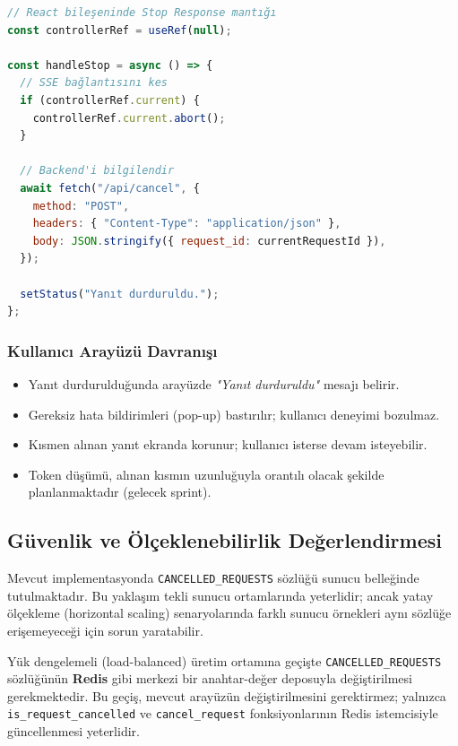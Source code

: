 \documentclass[12pt,a4paper]{article}
\begin{document}
\begin{lstlisting}[language=JavaScript, caption={Frontend AbortController Entegrasyonu}]
// React bileşeninde Stop Response mantığı
const controllerRef = useRef(null);

const handleStop = async () => {
  // SSE bağlantısını kes
  if (controllerRef.current) {
    controllerRef.current.abort();
  }

  // Backend'i bilgilendir
  await fetch("/api/cancel", {
    method: "POST",
    headers: { "Content-Type": "application/json" },
    body: JSON.stringify({ request_id: currentRequestId }),
  });

  setStatus("Yanıt durduruldu.");
};
\end{lstlisting}

\subsubsection{Kullanıcı Arayüzü Davranışı}

\begin{notebox}
\begin{itemize}[leftmargin=1.5em, itemsep=2pt]
    \item Yanıt durdurulduğunda arayüzde \emph{"Yanıt durduruldu"} mesajı belirir.
    \item Gereksiz hata bildirimleri (pop-up) bastırılır; kullanıcı deneyimi bozulmaz.
    \item Kısmen alınan yanıt ekranda korunur; kullanıcı isterse devam isteyebilir.
    \item Token düşümü, alınan kısmın uzunluğuyla orantılı olacak şekilde planlanmaktadır (gelecek sprint).
\end{itemize}
\end{notebox}

\subsection{Güvenlik ve Ölçeklenebilirlik Değerlendirmesi}

Mevcut implementasyonda \texttt{CANCELLED\_REQUESTS} sözlüğü sunucu belleğinde tutulmaktadır. Bu yaklaşım tekli sunucu ortamlarında yeterlidir; ancak yatay ölçekleme (horizontal scaling) senaryolarında farklı sunucu örnekleri aynı sözlüğe erişemeyeceği için sorun yaratabilir.

\begin{warnbox}
Yük dengelemeli (load-balanced) üretim ortamına geçişte \texttt{CANCELLED\_REQUESTS} sözlüğünün \textbf{Redis} gibi merkezi bir anahtar-değer deposuyla değiştirilmesi gerekmektedir. Bu geçiş, mevcut arayüzün değiştirilmesini gerektirmez; yalnızca \texttt{is\_request\_cancelled} ve \texttt{cancel\_request} fonksiyonlarının Redis istemcisiyle güncellenmesi yeterlidir.
\end{warnbox}
\end{document}
